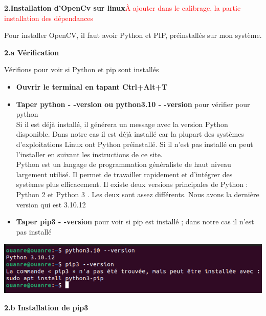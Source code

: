 \documentclass[12pt,a4paper]{article}
\begin{document}
\begin{center}
	\textbf{2.Installation d'OpenCv sur linux}\textcolor{red}{À ajouter dans le calibrage, la partie installation des dépendances}
\end{center}

Pour installer OpenCV, il faut avoir Python et PIP, préinstallés sur mon système. 

\begin{center}
	\textbf{2.a Vérification}
\end{center}

Vérifions pour voir si Python et pip sont installés
\begin{itemize}
\item \textbf{Ouvrir le terminal en tapant Ctrl+Alt+T }
\item \textbf{Taper python - -version ou python3.10 - -version } pour vérifier pour python\\
Si il est déjà installé, il générera un message avec la version Python disponible. Dans notre cas il est déjà installé car la plupart des systèmes d'exploitations Linux ont Python préinstallé. Si il n'est pas installé on peut l'installer en suivant les instructions de ce site.\cite{noauthor_comment_nodate} \\
Python est un langage de programmation généraliste de haut niveau largement utilisé. Il permet de travailler rapidement et d'intégrer des systèmes plus efficacement. Il existe deux versions principales de Python : Python 2 et Python 3 . Les deux sont assez différents. Nous avons la dernière version qui est 3.10.12\\

\item \textbf{Taper pip3 - -version} pour voir si pip est installé ; dans notre cas il n'est pas installé \\
\end{itemize}

\includegraphics[scale=0.7]{image/Verification(python et pip).png}


\begin{center}
	\textbf{2.b Installation de pip3 \cite{noauthor_comment_nodate-1}}
\end{center}
\end{document}
